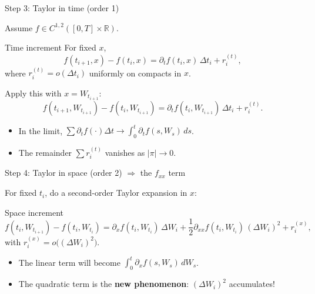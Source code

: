\documentclass[10pt,aspectratio=169]{beamer}
\newcommand{\R}{\mathbb{R}}
\begin{document}
\begin{frame}{Step 3: Taylor in time (order 1)}

Assume $f\in C^{1,2}([0,T]\times\R)$.\pause

\begin{block}{Time increment}
For fixed $x$,
\[
f(t_{i+1},x)-f(t_i,x)
=
\partial_t f(t_i,x)\,\Delta t_i
+ r^{(t)}_{i},
\]
where $r^{(t)}_{i}=o(\Delta t_i)$ uniformly on compacts in $x$.
\end{block}\pause

Apply this with $x=W_{t_{i+1}}$:\pause
\[
f(t_{i+1},W_{t_{i+1}})-f(t_i,W_{t_{i+1}})
=
\partial_t f(t_i,W_{t_{i+1}})\,\Delta t_i
+ r^{(t)}_{i}.
\]\pause

\begin{itemize}
  \item In the limit, $\sum \partial_t f(\cdot)\Delta t \to \int_0^t \partial_t f(s,W_s)\,ds$.\pause
  \item The remainder $\sum r^{(t)}_{i}$ vanishes as $|\pi|\to0$.
\end{itemize}

\end{frame}

\begin{frame}{Step 4: Taylor in space (order 2) \texorpdfstring{$\Rightarrow$}{=>} the $f_{xx}$ term}

For fixed $t_i$, do a second-order Taylor expansion in $x$:\pause

\begin{block}{Space increment}
\[
f(t_i,W_{t_{i+1}})-f(t_i,W_{t_i})
=
\partial_x f(t_i,W_{t_i})\,\Delta W_i
+\frac12 \partial_{xx} f(t_i,W_{t_i})\,(\Delta W_i)^2
+r^{(x)}_{i},
\]
with $r^{(x)}_{i}=o\big((\Delta W_i)^2\big)$.
\end{block}\pause

\begin{itemize}
  \item The linear term will become $\int_0^t \partial_x f(s,W_s)\,dW_s$.\pause
  \item The quadratic term is the \textbf{new phenomenon}: $(\Delta W_i)^2$ accumulates!
\end{itemize}

\end{frame}
\end{document}
